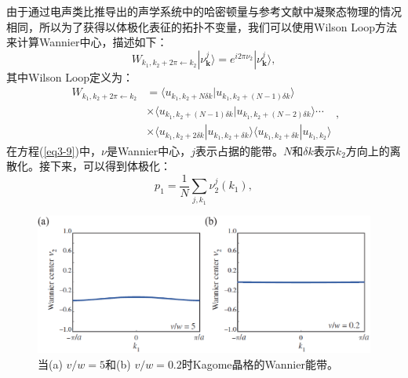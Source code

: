 由于通过电声类比推导出的声学系统中的哈密顿量与参考文献\cite{f6}中凝聚态物理的情况相同，所以为了获得以体极化表征的拓扑不变量，我们可以使用Wilson Loop方法来计算Wannier中心，描述如下\cite{i5}：
\begin{equation}
W_{k_1,k_2 + 2\pi \leftarrow k_2}|\nu_{\mathbf{k}}^j\rangle = e^{i2\pi \nu_2}|\nu_{\mathbf{k}}^j\rangle,
\end{equation}
其中Wilson Loop定义为：
\begin{equation}\label{eq3-9}
  \begin{aligned}
  W_{k_1,k_2 + 2\pi \leftarrow k_2} &= \langle u_{k_1,k_2 + N\delta k}|u_{k_1,k_2 + (N - 1)\delta k}\rangle\\
  &\times \langle u_{k_1,k_2 + (N - 1)\delta k}|u_{k_1,k_2 + (N - 2)\delta k}\rangle \cdots\\
  &\times \langle u_{k_1,k_2 + 2\delta k}|u_{k_1,k_2 + \delta k}\rangle\langle u_{k_1,k_2 + \delta k}|u_{k_1,k_2}\rangle
  \end{aligned},
\end{equation}
在方程(\ref{eq3-9})中，\(\nu\)是Wannier中心，\(j\)表示占据的能带。\(N\)和\(\delta k\)表示\(k_2\)方向上的离散化。接下来，可以得到体极化：
\begin{equation} \label{eq3-10}
  p_1 = \frac{1}{N} \sum_{j,k_1} \nu_2^j(k_1),
\end{equation}

\begin{figure}[h!]
  \centering
  \includegraphics[width=1\textwidth]{images/fig3-5.eps} 
  \caption{当(a) \(v/w = 5\)和(b) \(v/w = 0.2\)时Kagome晶格的Wannier能带。
  }
  \label{fig_3_5}
\end{figure}

